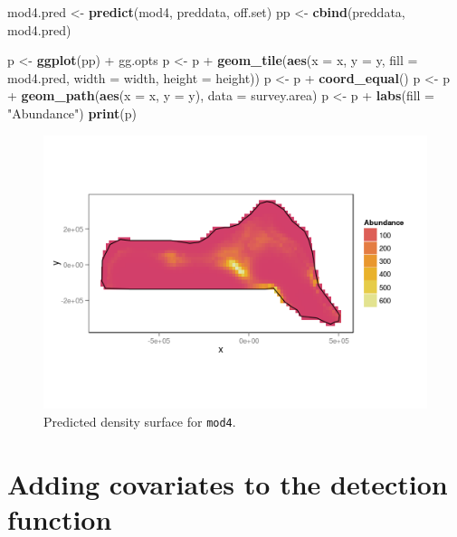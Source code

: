 \documentclass[]{amsart}
\makeatletter
\newenvironment{Shaded}{}{}
\newcommand{\KeywordTok}[1]{\textcolor[rgb]{0.00,0.44,0.13}{\textbf{{#1}}}}
\newcommand{\DataTypeTok}[1]{\textcolor[rgb]{0.56,0.13,0.00}{{#1}}}
\newcommand{\StringTok}[1]{\textcolor[rgb]{0.25,0.44,0.63}{{#1}}}
\newcommand{\NormalTok}[1]{{#1}}
\def\maxwidth{\ifdim\Gin@nat@width>\linewidth\linewidth
\else\Gin@nat@width\fi}
\let\Oldincludegraphics\includegraphics
\renewcommand{\includegraphics}[1]{\Oldincludegraphics[width=\maxwidth]{#1}}
\makeatother
\begin{document}
\begin{Shaded}
\begin{Highlighting}[]
\NormalTok{mod4.pred <-}\StringTok{ }\KeywordTok{predict}\NormalTok{(mod4, preddata, off.set)}
\NormalTok{pp <-}\StringTok{ }\KeywordTok{cbind}\NormalTok{(preddata, mod4.pred)}

\NormalTok{p <-}\StringTok{ }\KeywordTok{ggplot}\NormalTok{(pp) +}\StringTok{ }\NormalTok{gg.opts}
\NormalTok{p <-}\StringTok{ }\NormalTok{p +}\StringTok{ }\KeywordTok{geom_tile}\NormalTok{(}\KeywordTok{aes}\NormalTok{(}\DataTypeTok{x =} \NormalTok{x, }\DataTypeTok{y =} \NormalTok{y, }\DataTypeTok{fill =} \NormalTok{mod4.pred, }
    \DataTypeTok{width =} \NormalTok{width, }\DataTypeTok{height =} \NormalTok{height))}
\NormalTok{p <-}\StringTok{ }\NormalTok{p +}\StringTok{ }\KeywordTok{coord_equal}\NormalTok{()}
\NormalTok{p <-}\StringTok{ }\NormalTok{p +}\StringTok{ }\KeywordTok{geom_path}\NormalTok{(}\KeywordTok{aes}\NormalTok{(}\DataTypeTok{x =} \NormalTok{x, }\DataTypeTok{y =} \NormalTok{y), }\DataTypeTok{data =} \NormalTok{survey.area)}
\NormalTok{p <-}\StringTok{ }\NormalTok{p +}\StringTok{ }\KeywordTok{labs}\NormalTok{(}\DataTypeTok{fill =} \StringTok{"Abundance"}\NormalTok{)}
\KeywordTok{print}\NormalTok{(p)}
\end{Highlighting}
\end{Shaded}

\begin{figure}[htbp]
\centering
\includegraphics{mexico-figs/mod4-pred.png}
\caption{Predicted density surface for \texttt{mod4}.}
\end{figure}

\section{Adding covariates to the detection function}
\end{document}
